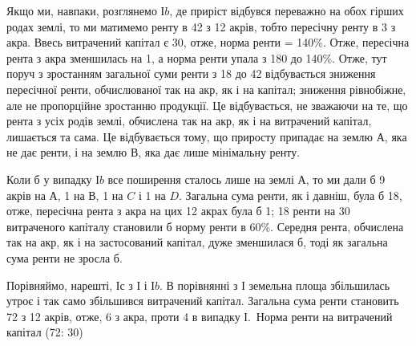 Якщо ми, навпаки, розглянемо І$b$, де приріст відбувся переважно на обох
гірших родах землі, то ми матимемо ренту в 42 з 12 акрів, тобто
пересічну ренту в 3 з акра. Ввесь витрачений капітал є 30,
отже, норма ренти = 140\%. Отже, пересічна рента з акра зменшилась на 1, а норма ренти упала з 180 до 140\%. Отже, тут поруч з зростанням
загальної суми ренти з 18 до 42 відбувається зниження
пересічної ренти, обчислюваної так на акр, як і на капітал; зниження рівнобіжне,
але не пропорційне зростанню продукції. Це відбувається, не зважаючи на те,
що рента з усіх родів землі, обчислена так на акр, як і на витрачений капітал,
лишається та сама. Це відбувається тому, що  приросту припадає на
землю $А$, яка не дає ренти, і на землю $В$, яка дає лише мінімальну ренту.

Коли б у випадку І$b$ все поширення сталось лише на землі $А$, то ми
дали б 9 акрів на $А$, 1 на $В$, 1 на $C$ і 1 на $D$. Загальна сума ренти, як і давніш,
була б 18, отже, пересічна рента з акра на цих 12 акрах
була б 1; 18 ренти на 30 витраченого капіталу
становили б норму ренти в 60\%. Середня рента, обчислена так на акр,
як і на застосований капітал, дуже зменшилася б, тоді як загальна сума ренти
не зросла б.

Порівняймо, нарешті, І$с$ з І і І$b$. В порівнянні з І земельна площа збільшилась
утроє і так само збільшився витрачений капітал. Загальна сума ренти
становить 72 з 12 акрів, отже, 6 з акра, проти 4 в випадку І.~Норма ренти на витрачений капітал (72: 30)
\parbreak{}  %
